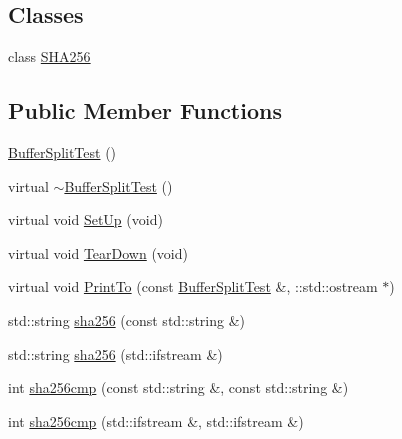 \subsection*{Classes}
\begin{DoxyCompactItemize}
\item 
class \hyperlink{classclang_1_1tidy_1_1pagesjaunes_1_1test_1_1_buffer_split_test_1_1_s_h_a256}{S\+H\+A256}
\end{DoxyCompactItemize}
\subsection*{Public Member Functions}
\begin{DoxyCompactItemize}
\item 
\hyperlink{classclang_1_1tidy_1_1pagesjaunes_1_1test_1_1_buffer_split_test_a5fea75a14368e25d61b869f7cd21f9ac}{Buffer\+Split\+Test} ()
\item 
virtual \hyperlink{classclang_1_1tidy_1_1pagesjaunes_1_1test_1_1_buffer_split_test_aeeb9515703433cdde79911331089e043}{$\sim$\+Buffer\+Split\+Test} ()
\item 
virtual void \hyperlink{classclang_1_1tidy_1_1pagesjaunes_1_1test_1_1_buffer_split_test_a58116007aecb9b8a2388beb5d3a64719}{Set\+Up} (void)
\item 
virtual void \hyperlink{classclang_1_1tidy_1_1pagesjaunes_1_1test_1_1_buffer_split_test_aae91b37fcc95236cbe42f939e69b3fc2}{Tear\+Down} (void)
\item 
virtual void \hyperlink{classclang_1_1tidy_1_1pagesjaunes_1_1test_1_1_buffer_split_test_a498e7432e19d0380e096380509fbfebd}{Print\+To} (const \hyperlink{classclang_1_1tidy_1_1pagesjaunes_1_1test_1_1_buffer_split_test}{Buffer\+Split\+Test} \&, \+::std\+::ostream $\ast$)
\item 
std\+::string \hyperlink{classclang_1_1tidy_1_1pagesjaunes_1_1test_1_1_buffer_split_test_ac6c4f0d179b494fb744b0b5df0db508d}{sha256} (const std\+::string \&)
\item 
std\+::string \hyperlink{classclang_1_1tidy_1_1pagesjaunes_1_1test_1_1_buffer_split_test_a6b7813358946f66b4ea5f149651c6e44}{sha256} (std\+::ifstream \&)
\item 
int \hyperlink{classclang_1_1tidy_1_1pagesjaunes_1_1test_1_1_buffer_split_test_a612d7a65fbe19e0f35c51eb6a68832ae}{sha256cmp} (const std\+::string \&, const std\+::string \&)
\item 
int \hyperlink{classclang_1_1tidy_1_1pagesjaunes_1_1test_1_1_buffer_split_test_abef0f37ba555b9c4829350bf7b7164c5}{sha256cmp} (std\+::ifstream \&, std\+::ifstream \&)
\end{DoxyCompactItemize}
